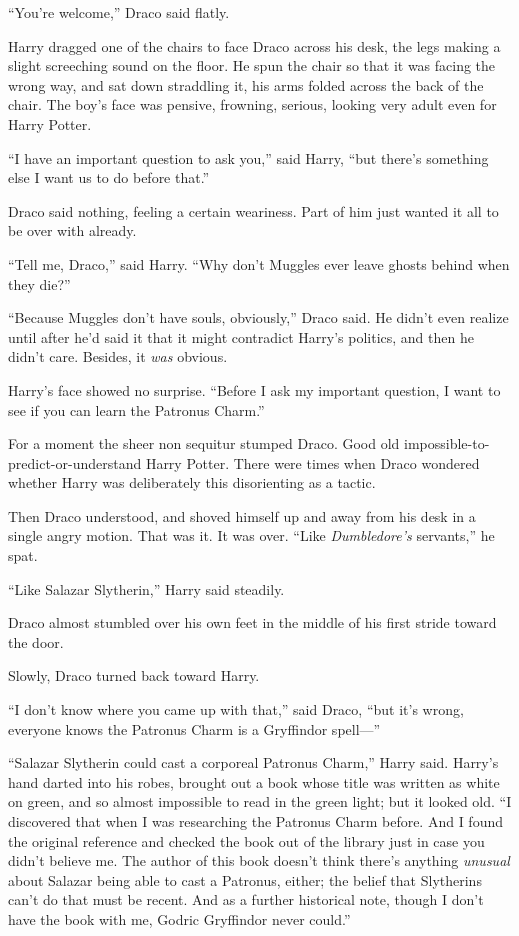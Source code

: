 “You’re welcome,” Draco said flatly.

Harry dragged one of the chairs to face Draco across his desk, the legs making a slight screeching sound on the floor. He spun the chair so that it was facing the wrong way, and sat down straddling it, his arms folded across the back of the chair. The boy’s face was pensive, frowning, serious, looking very adult even for Harry Potter.

“I have an important question to ask you,” said Harry, “but there’s something else I want us to do before that.”

Draco said nothing, feeling a certain weariness. Part of him just wanted it all to be over with already.

“Tell me, Draco,” said Harry. “Why don’t Muggles ever leave ghosts behind when they die?”

“Because Muggles don’t have souls, obviously,” Draco said. He didn’t even realize until after he’d said it that it might contradict Harry’s politics, and then he didn’t care. Besides, it \emph{was} obvious.

Harry’s face showed no surprise. “Before I ask my important question, I want to see if you can learn the Patronus Charm.”

For a moment the sheer non sequitur stumped Draco. Good old impossible-to-predict-or-understand Harry Potter. There were times when Draco wondered whether Harry was deliberately this disorienting as a tactic.

Then Draco understood, and shoved himself up and away from his desk in a single angry motion. That was it. It was over. “Like \emph{Dumbledore’s} servants,” he spat.

“Like Salazar Slytherin,” Harry said steadily.

Draco almost stumbled over his own feet in the middle of his first stride toward the door.

Slowly, Draco turned back toward Harry.

“I don’t know where you came up with that,” said Draco, “but it’s wrong, everyone knows the Patronus Charm is a Gryffindor spell—”

“Salazar Slytherin could cast a corporeal Patronus Charm,” Harry said. Harry’s hand darted into his robes, brought out a book whose title was written as white on green, and so almost impossible to read in the green light; but it looked old. “I discovered that when I was researching the Patronus Charm before. And I found the original reference and checked the book out of the library just in case you didn’t believe me. The author of this book doesn’t think there’s anything \emph{unusual} about Salazar being able to cast a Patronus, either; the belief that Slytherins can’t do that must be recent. And as a further historical note, though I don’t have the book with me, Godric Gryffindor never could.”


